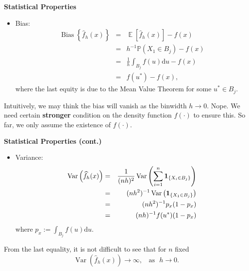 \documentclass[19pt,landscape]{article}
\newcommand{\IP}{\mathbb{P}}
\newcommand{\bone}{{\bf 1}}
\DeclareMathOperator{\E}{\mathbb{E}}
\DeclareMathOperator{\var}{\mathrm{Var}}
\DeclareMathOperator{\bs}{\mathrm{Bias}}
\begin{document}
\newpage
{\LARGE\centerline{\textbf{Statistical Properties}}}
\vskip25pt
\begin{minipage}{.9\textwidth}
    \Large
    \begin{itemize}
        \item Bias: 
        \begin{eqnarray}
            \bs\left\{\widehat{f}_h(x)\right\}&=&\E\left[\widehat{f}_h(x)\right]-f(x)\nonumber\\
            &=&h^{-1}\IP\left(X_1\in B_j\right)-f(x)\nonumber\\
            &=&\frac1h\int_{B_j}f(u)\mathrm{d}u-f(x)\nonumber\\
            &=&f(u^*)-f(x),\label{bs-mvt}
        \end{eqnarray}
        where the last equity is due to the Mean Value Theorem for some $u^*\in B_j$. 
    \end{itemize}
Intuitively, we may think the bias will vanish as the binwidth $h\to0$. Nope. We need certain {\bf stronger} condition on the density function $f(\cdot)$ to ensure this. So far, we only assume the existence of $f(\cdot)$.
\end{minipage}

\newpage
{\LARGE\centerline{\textbf{Statistical Properties (cont.)}}}
\vskip25pt
\begin{minipage}{.9\textwidth}
    \Large
    \begin{itemize}
        \item Variance:
        \begin{eqnarray}
            \var\left(\widehat{f}_h(x)\right)&=&\frac1{(nh)^2}\var\left(\sum_{i=1}^n\bone_{\{X_i\in B_j\}}\right)\nonumber\\
            &=&(nh^2)^{-1}\var\left(\bone_{\{X_1\in B_j\}}\right)\nonumber\\
            &=&(nh^2)^{-1}p_x(1-p_x)\\
            &=&(nh)^{-1}f(u^*)(1-p_x)\label{var-bound1}
        \end{eqnarray}
        where $p_x:=\int_{B_j}f(u)\mathrm{d}u$.
    \end{itemize}
From the last equality, it is not difficult to see that for $n$ fixed 
$$\var\left(\widehat{f}_h(x)\right)\to\infty,~~~~\mathrm{as}~~~h\to0.$$ 
\end{minipage}
\end{document}
